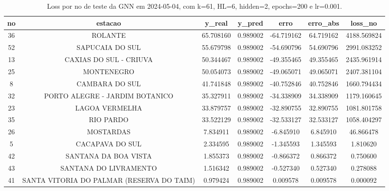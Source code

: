 \begin{table}[h]
\centering
\caption{Loss por no de teste da GNN em 2024-05-04, com k=61, HL=6, hidden=2, epochs=200 e lr=0.001.}
\label{tab:gnn_loss_k61_hl6_h2_e200_d20240504}
\begin{tabular}{ccccccc}
\toprule
no & estacao & y\_real & y\_pred & erro & erro\_abs & loss\_no \\
\midrule
36 & ROLANTE & 65.708160 & 0.989002 & -64.719162 & 64.719162 & 4188.569824 \\
52 & SAPUCAIA DO SUL & 55.679798 & 0.989002 & -54.690796 & 54.690796 & 2991.083252 \\
13 & CAXIAS DO SUL - CRIUVA & 50.344467 & 0.989002 & -49.355465 & 49.355465 & 2435.961914 \\
25 & MONTENEGRO & 50.054073 & 0.989002 & -49.065071 & 49.065071 & 2407.381104 \\
8 & CAMBARA DO SUL & 41.741848 & 0.989002 & -40.752846 & 40.752846 & 1660.794434 \\
32 & PORTO ALEGRE - JARDIM BOTANICO & 35.327911 & 0.989002 & -34.338909 & 34.338909 & 1179.160645 \\
23 & LAGOA VERMELHA & 33.879757 & 0.989002 & -32.890755 & 32.890755 & 1081.801758 \\
35 & RIO PARDO & 33.522129 & 0.989002 & -32.533127 & 32.533127 & 1058.404297 \\
26 & MOSTARDAS & 7.834911 & 0.989002 & -6.845910 & 6.845910 & 46.866478 \\
5 & CACAPAVA DO SUL & 2.334595 & 0.989002 & -1.345593 & 1.345593 & 1.810620 \\
42 & SANTANA DA BOA VISTA & 1.855373 & 0.989002 & -0.866372 & 0.866372 & 0.750600 \\
43 & SANTANA DO LIVRAMENTO & 1.516342 & 0.989002 & -0.527340 & 0.527340 & 0.278088 \\
41 & SANTA VITORIA DO PALMAR (RESERVA DO TAIM) & 0.979424 & 0.989002 & 0.009578 & 0.009578 & 0.000092 \\
\bottomrule
\end{tabular}
\end{table}
